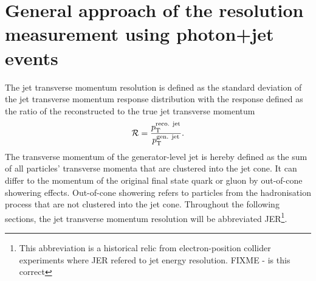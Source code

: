 \chapter{General approach of the resolution measurement using photon+jet events}
\label{res:ch:GeneralApproach}

The jet transverse momentum resolution is defined as the standard deviation of the jet transverse momentum response distribution with the response defined as the ratio of the reconstructed to the true jet transverse momentum 
\begin{equation}\label{res:eq:responseFormula}
\mathcal{R} =  \frac{p_{\text{T}}^{\text{reco. jet}}}{p_{\text{T}}^{\text{gen. jet}}}.
\end{equation}
The transverse momentum of the generator-level jet is hereby defined as the sum of all particles' transverse momenta that are clustered into the jet cone.
It can differ to the momentum of the original final state quark or gluon by out-of-cone showering effects.
Out-of-cone showering refers to particles from the hadronisation process that are not clustered into the jet cone.
Throughout the following sections, the jet transverse momentum resolution will be abbreviated JER\footnote{This abbreviation is a historical relic from electron-position collider experiments where JER refered to jet energy resolution. FIXME - is this correct}.

